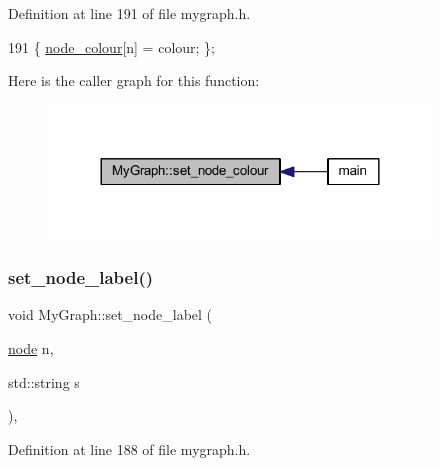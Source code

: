 Definition at line 191 of file mygraph.\+h.


\begin{DoxyCode}
191 \{ \mbox{\hyperlink{class_my_graph_aa42370fd94b5789077f0ad70b76e4285}{node\_colour}}[n] = colour; \};
\end{DoxyCode}
Here is the caller graph for this function\+:
\nopagebreak
\begin{figure}[H]
\begin{center}
\leavevmode
\includegraphics[width=288pt]{class_my_graph_a4cada42859b2a657637e81eef7c6e4ab_icgraph}
\end{center}
\end{figure}
\mbox{\label{class_my_graph_ac70ce0dc28c8589443e45ef89acd00ca}} 
\subsubsection{\texorpdfstring{set\+\_\+node\+\_\+label()}{set\_node\_label()}}
{\footnotesize\ttfamily void My\+Graph\+::set\+\_\+node\+\_\+label (\begin{DoxyParamCaption}\item[{\mbox{\hyperlink{classnode}{node}}}]{n,  }\item[{std\+::string}]{s }\end{DoxyParamCaption})\hspace{0.3cm}{\ttfamily [inline]}, {\ttfamily [inherited]}}



Definition at line 188 of file mygraph.\+h.


